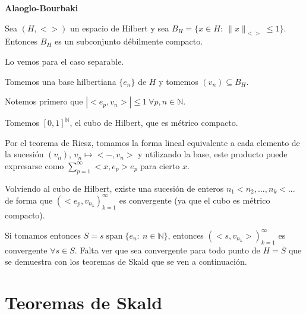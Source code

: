 \documentclass[openany]{book}
\begin{document}
\begin{theorem}
    \textbf{Alaoglo-Bourbaki}

    Sea $ (H,<>) $ un espacio de Hilbert y sea $ B_{H} = \{x \in H:\ \|x\|_{<>} \leq  1\} $. Entonces $ B_{H} $ es un subconjunto débilmente compacto.
\end{theorem}



\begin{demonstration}

    Lo vemos para el caso separable.

    Tomemos una base hilbertiana $ \{e_n\} $ de $ H $ y tomemos $ (v_n) \subseteq  B_{H} $.
    
    Notemos primero que $ |<e_{p},v_n>| \leq  1\ \forall p,n \in \mathbb{N} $. 

    Tomemos $ [0,1]^{\mathbb{N}} $, el cubo de Hilbert, que es métrico compacto.

    Por el teorema de Riesz, tomamos la forma lineal equivalente a cada elemento de la sucesión $ (v_n) $, $ v_n \mapsto <-,v_n > $ y utilizando la base, este producto puede expresarse como $ \sum\limits_{p=1}^{\infty} <x,e_{p}>e_{p} $ para cierto $ x $.

    Volviendo al cubo de Hilbert, existe una sucesión de enteros $ n_1<n_2,...,n_{k}<... $ de forma que $ (<e_{p},v_{n_{k}})_{k=1}^{\infty} $ es convergente (ya que el cubo es métrico compacto).

    Si tomamos entonces $ S = s\operatorname{span}\{e_n:\ n \in \mathbb{N}\} $, entonces $ (<s,v_{n_{k}}>)_{k=1}^{\infty} $ es convergente $ \forall  s \in S $. Falta ver que sea convergente para todo punto de $ H = \overline{S} $ que se demuestra con los teoremas de Skald que se ven a continuación.

\end{demonstration}

\section{Teoremas de Skald}
\end{document}
